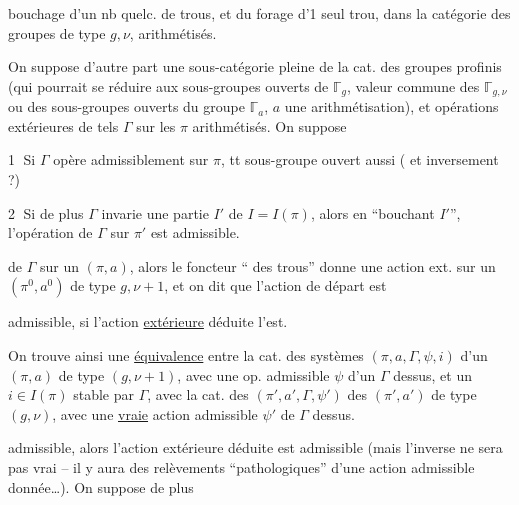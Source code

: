 bouchage d'un nb quelc. de trous, et
du forage d'1 seul trou, dans la
catégorie des groupes de type $g,\nu$,
arithmétisés.

On suppose d'autre part  une
sous-catégorie pleine de la cat. des groupes
profinis (qui pourrait se réduire aux
sous-groupes ouverts de $\mathbb{\Gamma}_g$, valeur
commune des $\mathbb{\Gamma}_{g,\nu}$ ou des sous-groupes
ouverts du groupe $\mathbb{\Gamma}_a$, $a$ une
arithmétisation), et  opérations
extérieures  de tels $\Gamma$ sur les
$\pi$ arithmétisés. On suppose

\textcircled{1} Si $\Gamma$ opère admissiblement sur $\pi$, tt
sous-groupe ouvert aussi ( et inversement ?)

\textcircled{2} Si de plus $\Gamma$ invarie une partie $I'$
de $I=I(\pi)$, alors en ``bouchant $I'$'',
l'opération de $\Gamma$ sur $\pi'$ est admissible.


de $\Gamma$ sur un $(\pi,a)$, alors le foncteur
 `` des trous'' donne une action
ext. sur un $(\pi^0,a^0)$ de type $g,\nu+1$,
et on dit que l'action de départ est

admissible, si l'action \uline{extérieure} déduite l'est.

On trouve ainsi une \uline{équivalence} entre
la cat. des  systèmes $(\pi,a,\Gamma,\psi,i)$
d'un $(\pi,a)$ de type $(g,\nu+1)$, avec une
op.  admissible $\psi$ d'un $\Gamma$ dessus, et
un $i\in I(\pi)$ stable par $\Gamma$, avec la cat.
des $(\pi',a',\Gamma,\psi')$ des $(\pi',a')$ de type
$(g,\nu)$, avec une \uline{vraie} action admissible $\psi'$
de $\Gamma$ dessus.

admissible, alors l'action extérieure déduite
est admissible (mais l'inverse ne
sera pas vrai -- il y aura des relèvements
``pathologiques'' d'une action  admissible
donnée\ldots). On suppose de plus

